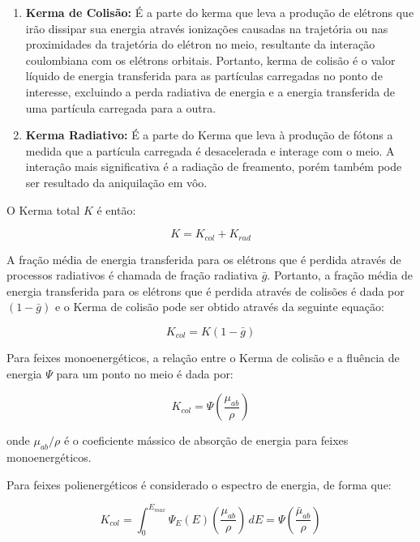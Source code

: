 \documentclass[11pt,a4paper]{article}
\begin{document}
		\begin{enumerate}
			\item \textcolor{CarnationPink}{\textbf{Kerma de Colisão:}} É a parte do kerma que leva a produção de elétrons que irão dissipar sua energia através ionizações causadas na trajetória ou nas proximidades da trajetória do elétron no meio, resultante da interação coulombiana com os elétrons orbitais. Portanto, kerma de colisão é o valor líquido de energia transferida para as partículas carregadas no ponto de interesse, excluindo a perda radiativa de energia e a energia transferida de uma partícula carregada para a outra.
			
			\item \textcolor{CarnationPink}{\textbf{Kerma Radiativo:}} É a parte do Kerma que leva à produção de fótons a medida que a partícula carregada é desacelerada e interage com o meio. A interação mais significativa é a radiação de freamento, porém também pode ser resultado da aniquilação em vôo.
		\end{enumerate}


		O Kerma total $K$ é então:

			\begin{equation}
				K = K_{col} + K_{rad}
			\end{equation}

		A fração média de energia transferida para os elétrons que é perdida através de processos radiativos é chamada de fração radiativa $\bar{g}$. Portanto, a fração média de energia transferida para os elétrons que é perdida através de colisões é dada por $(1 - \bar{g})$ e o Kerma de colisão pode ser obtido através da seguinte equação:

			\begin{equation}
				K_{col} = K(1 - \bar{g})
			\end{equation}

		Para feixes monoenergéticos, a relação entre o Kerma de colisão e a fluência de energia $\Psi$ para um ponto no meio é dada por:

			\begin{equation}
				K_{col} = \Psi \left(\frac{\mu_{ab}}{\rho}\right)
			\end{equation}

		\noindent onde $\mu_{ab}/\rho$ é o coeficiente mássico de absorção de energia para feixes monoenergéticos. 

		Para feixes polienergéticos é considerado o espectro de energia, de forma que:

			\begin{equation}
				K_{col} = \int_{0}^{E_{max}} \Psi_E(E) \left(\frac{\mu_{ab}}{\rho}\right)  \,dE 
				= \Psi \left(\frac{\bar{\mu}_{ab}}{\rho}\right)
			\end{equation}
\end{document}
